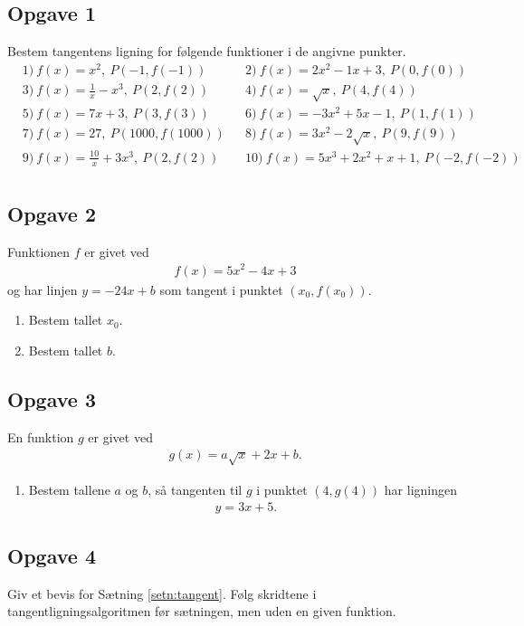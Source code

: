 \subsection*{Opgave 1}
Bestem tangentens ligning for følgende funktioner i de angivne punkter.
\begin{align*}
&1) \ f(x) = x^2,\  P(-1,f(-1))  &&2) \   f(x)=2x^2-1x+3, \ P(0,f(0))    \\
&3) \ f(x) = \frac{1}{x} -x^3, \ P(2,f(2))   &&4) \ f(x) = \sqrt{x}, \ P(4,f(4))    \\
&5) \ f(x) = 7x+3,\ P(3,f(3))   &&6) \ f(x) = -3x^2+5x-1, \ P(1,f(1))     \\
&7) \ f(x) = 27, \ P(1000,f(1000))   &&8) \ f(x) = 3x^2-2\sqrt{x}, \ P(9,f(9))     \\
&9) \ f(x) = \frac{10}{x}+3x^3, \ P(2,f(2))   &&10) \ f(x) = 5x^3+2x^2+x+1, \ P(-2,f(-2))     \\
\end{align*}
	
\subsection*{Opgave 2}
Funktionen $f$ er givet ved
\begin{align*}
	f(x) = 5x^2 - 4x + 3	
\end{align*}
og har linjen $y = -24x + b$ som tangent i punktet $(x_0,f(x_0))$.
\begin{enumerate}[label=\roman*)]
	\item Bestem tallet $x_0$.
	\item Bestem tallet $b$.
\end{enumerate}

\subsection*{Opgave 3}
En funktion $g$ er givet ved
\begin{align*}
	g(x) = a\sqrt{x} + 2x + b.
\end{align*}
\begin{enumerate}[label=\roman*)]
	\item Bestem tallene $a$ og $b$, så tangenten til $g$ i punktet $(4,g(4))$ har ligningen
	\begin{align*}
		y = 3x + 5.
	\end{align*}
\end{enumerate}


\subsection*{Opgave 4}
Giv et bevis for Sætning \ref{setn:tangent}. Følg skridtene i tangentligningsalgoritmen før sætningen, men uden en given funktion.

